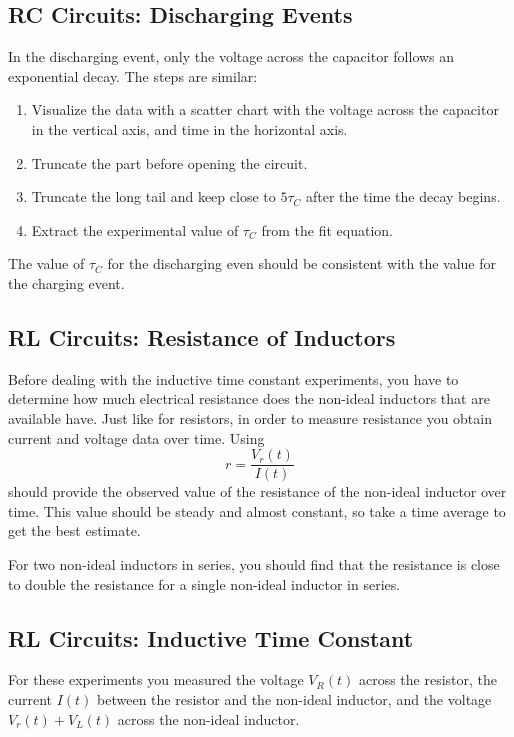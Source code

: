 \subsection{RC Circuits: Discharging Events}
In the discharging event, only the voltage across the capacitor follows an exponential decay. The steps are similar:
\begin{enumerate}
    \item Visualize the data with a scatter chart with the voltage across the capacitor in the vertical axis, and time in the horizontal axis.
    \item Truncate the part before opening the circuit.
    \item Truncate the long tail and keep close to $5\tau_{C}$ after the time the decay begins.
    \item Extract the experimental value of $\tau_{C}$ from the fit equation.
\end{enumerate}
The value of $\tau_{C}$ for the discharging even should be consistent with the value for the charging event.
\subsection{RL Circuits: Resistance of Inductors}
Before dealing with the inductive time constant experiments, you have to determine how much electrical resistance does the non-ideal inductors that are available have. Just like for resistors, in order to measure resistance you obtain current and voltage data over time. Using
\begin{equation}
    r = \frac{V_{r}(t)}{I(t)}
\end{equation}
should provide the observed value of the resistance of the non-ideal inductor over time. This value should be steady and almost constant, so take a time average to get the best estimate.

For two non-ideal inductors in series, you should find that the resistance is close to double the resistance for a single non-ideal inductor in series. 
\subsection{RL Circuits: Inductive Time Constant}
For these experiments you measured the voltage $V_{R}(t)$ across the resistor, the current $I(t)$ between the resistor and the non-ideal inductor, and the voltage $V_{r}(t) + V_{L}(t)$ across the non-ideal inductor.


